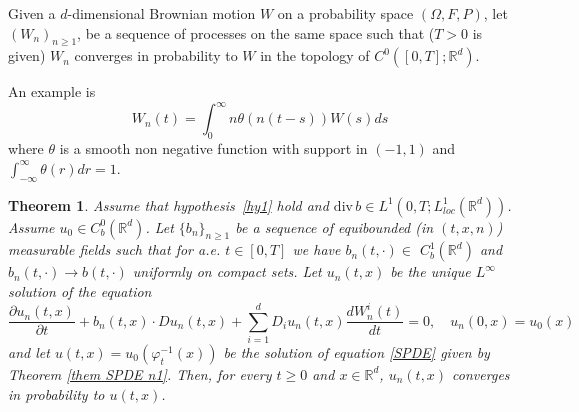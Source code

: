 \documentclass[a4paper,11pt]{article}
\newtheorem{theorem}{Theorem}
\begin{document}
Given a $d$-dimensional Brownian motion $W$ on a probability space $\left(
\Omega,F,P\right) $, let $\left( W_{n}\right) _{n\geq1}$, be a sequence of
processes on the same space such that ($T>0$ is given) $W_{n}$ converges in
probability to $W$ in the topology of $C^{0}\left( \left[ 0,T\right] ;%
\mathbb{R}^{d}\right)$.

An example is
\begin{equation}  \label{eq:wz-example}
W_{n}\left( t\right) =\int_{0}^{\infty}n\theta\left( n\left( t-s\right)
\right) W\left( s\right) ds
\end{equation}
where $\theta$ is a smooth non negative function with support in $\left(
-1,1\right) $ and $\int_{-\infty}^{\infty}\theta\left( r\right) dr=1$.

\begin{theorem}
Assume that hypothesis~\ref{hy1} hold and $\mathrm{div}\,b\in L^{1}\left(
0,T;L_{loc}^{1}(\mathbb{R}^{d})\right) $. Assume $u_{0}\in C_{b}^{0}\left(
\mathbb{R}^{d}\right) $. Let $\{b_{n}\}_{n\geq 1}$ be a sequence of
equibounded (in $\left( t,x,n\right) $) measurable fields such that for a.e.
$t\in \left[ 0,T\right] $ we have $b_{n}\left( t,\cdot \right) \in $ $%
C_{b}^{1}(\mathbb{R}^{d})$ and $b_{n}\left( t,\cdot \right) \rightarrow
b\left( t,\cdot \right) $ uniformly on compact sets. Let $u_{n}(t,x)$ be the
unique $L^{\infty }$ solution of the equation
\begin{equation*}
\frac{\partial u_{n}(t,x)}{\partial t}+b_{n}(t,x)\cdot
Du_{n}(t,x)+\sum_{i=1}^{d}D_{i}u_{n}(t,x)\frac{dW_{n}^{i}(t)}{dt}=0,\quad
u_{n}(0,x)=u_{0}(x)
\end{equation*}
and let $u(t,x)=u_{0}\left( \varphi _{t}^{-1}\left( x\right) \right) $ be
the solution of equation \eqref{SPDE} given by Theorem \ref{them SPDE n1}.
Then, for every $t\geq 0$ and $x\in \mathbb{R}^{d}$, $u_{n}\left( t,x\right)
$ converges in probability to $u\left( t,x\right) $.
\end{theorem}
\end{document}
